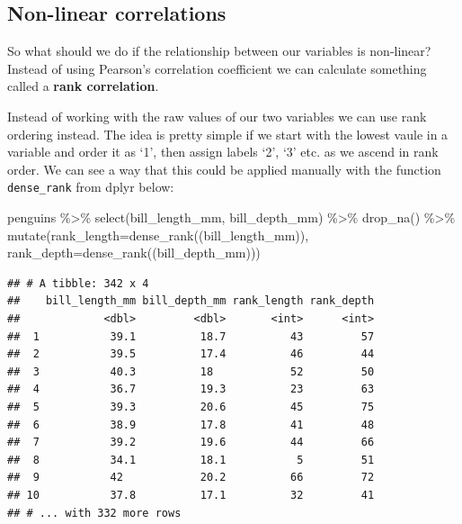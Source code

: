 \documentclass[
]{book}
\newenvironment{Shaded}{\begin{snugshade}}{\end{snugshade}}
\newcommand{\AttributeTok}[1]{\textcolor[rgb]{0.77,0.63,0.00}{#1}}
\newcommand{\FunctionTok}[1]{\textcolor[rgb]{0.00,0.00,0.00}{#1}}
\newcommand{\NormalTok}[1]{#1}
\newcommand{\SpecialCharTok}[1]{\textcolor[rgb]{0.00,0.00,0.00}{#1}}
\begin{document}
\hypertarget{non-linear-correlations}{%
\subsection{Non-linear correlations}\label{non-linear-correlations}}

So what should we do if the relationship between our variables is non-linear? Instead of using Pearson's correlation coefficient we can calculate something called a \textbf{rank correlation}.

Instead of working with the raw values of our two variables we can use rank ordering instead. The idea is pretty simple if we start with the lowest vaule in a variable and order it as `1', then assign labels `2', `3' etc. as we ascend in rank order. We can see a way that this could be applied manually with the function \texttt{dense\_rank} from dplyr below:

\begin{Shaded}
\begin{Highlighting}[]
\NormalTok{penguins }\SpecialCharTok{\%\textgreater{}\%} \FunctionTok{select}\NormalTok{(bill\_length\_mm, }
\NormalTok{                    bill\_depth\_mm) }\SpecialCharTok{\%\textgreater{}\%} 
  \FunctionTok{drop\_na}\NormalTok{() }\SpecialCharTok{\%\textgreater{}\%} 
  \FunctionTok{mutate}\NormalTok{(}\AttributeTok{rank\_length=}\FunctionTok{dense\_rank}\NormalTok{((bill\_length\_mm)), }
         \AttributeTok{rank\_depth=}\FunctionTok{dense\_rank}\NormalTok{((bill\_depth\_mm)))}
\end{Highlighting}
\end{Shaded}

\begin{verbatim}
## # A tibble: 342 x 4
##    bill_length_mm bill_depth_mm rank_length rank_depth
##             <dbl>         <dbl>       <int>      <int>
##  1           39.1          18.7          43         57
##  2           39.5          17.4          46         44
##  3           40.3          18            52         50
##  4           36.7          19.3          23         63
##  5           39.3          20.6          45         75
##  6           38.9          17.8          41         48
##  7           39.2          19.6          44         66
##  8           34.1          18.1           5         51
##  9           42            20.2          66         72
## 10           37.8          17.1          32         41
## # ... with 332 more rows
\end{verbatim}
\end{document}
